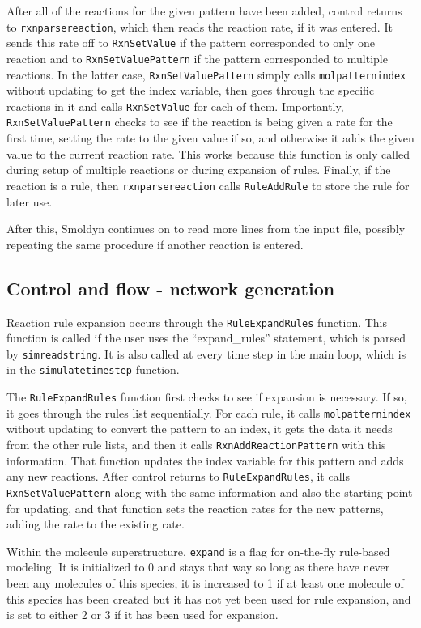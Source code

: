 \documentclass {scrbook}
\newcommand {\ttt} {\texttt}
\begin{document}
After all of the reactions for the given pattern have been added, control returns to \ttt{rxnparsereaction}, which then reads the reaction rate, if it was entered. It sends this rate off to \ttt{RxnSetValue} if the pattern corresponded to only one reaction and to \ttt{RxnSetValuePattern} if the pattern corresponded to multiple reactions. In the latter case, \ttt{RxnSetValuePattern} simply calls \ttt{molpatternindex} without updating to get the index variable, then goes through the specific reactions in it and calls \ttt{RxnSetValue} for each of them. Importantly, \ttt{RxnSetValuePattern} checks to see if the reaction is being given a rate for the first time, setting the rate to the given value if so, and otherwise it adds the given value to the current reaction rate. This works because this function is only called during setup of multiple reactions or during expansion of rules. Finally, if the reaction is a rule, then \ttt{rxnparsereaction} calls \ttt{RuleAddRule} to store the rule for later use.

After this, Smoldyn continues on to read more lines from the input file, possibly repeating the same procedure if another reaction is entered.

\subsection{Control and flow - network generation}

Reaction rule expansion occurs through the \ttt{RuleExpandRules} function. This function is called if the user uses the ``expand\_rules'' statement, which is parsed by \ttt{simreadstring}. It is also called at every time step in the main loop, which is in the \ttt{simulatetimestep} function.

The \ttt{RuleExpandRules} function first checks to see if expansion is necessary. If so, it goes through the rules list sequentially. For each rule, it calls \ttt{molpatternindex} without updating to convert the pattern to an index, it gets the data it needs from the other rule lists, and then it calls \ttt{RxnAddReactionPattern} with this information. That function updates the index variable for this pattern and adds any new reactions. After control returns to \ttt{RuleExpandRules}, it calls \ttt{RxnSetValuePattern} along with the same information and also the starting point for updating, and that function sets the reaction rates for the new patterns, adding the rate to the existing rate.

Within the molecule superstructure, \ttt{expand} is a flag for on-the-fly rule-based modeling. It is initialized to 0 and stays that way so long as there have never been any molecules of this species, it is increased to 1 if at least one molecule of this species has been created but it has not yet been used for rule expansion, and is set to either 2 or 3 if it has been used for expansion.
\end{document}
